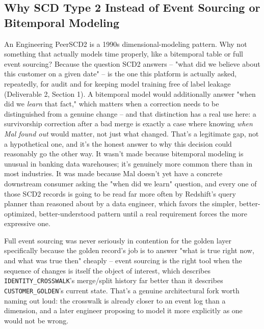 \documentclass[11pt]{article}
\begin{document}
\subsection{Why SCD Type 2 Instead of Event Sourcing or Bitemporal Modeling}
\begin{stakeholderq}{An Engineering Peer}{SCD2 is a 1990s dimensional-modeling pattern. Why not something that actually models time properly, like a bitemporal table or full event sourcing?}
Because the question SCD2 answers -- "what did we believe about this customer on a given date" -- is the one this platform is actually asked, repeatedly, for audit and for keeping model training free of label leakage (Deliverable 2, Section 1). A bitemporal model would additionally answer "when did we \emph{learn} that fact," which matters when a correction needs to be distinguished from a genuine change -- and that distinction has a real use here: a survivorship correction after a bad merge is exactly a case where knowing \emph{when Mal found out} would matter, not just what changed. That's a legitimate gap, not a hypothetical one, and it's the honest answer to why this decision could reasonably go the other way. It wasn't made because bitemporal modeling is unusual in banking data warehouses; it's genuinely more common there than in most industries. It was made because Mal doesn't yet have a concrete downstream consumer asking the "when did we learn" question, and every one of those SCD2 records is going to be read far more often by Redshift's query planner than reasoned about by a data engineer, which favors the simpler, better-optimized, better-understood pattern until a real requirement forces the more expressive one.

Full event sourcing was never seriously in contention for the golden layer specifically because the golden record's job is to answer "what is true right now, and what was true then" cheaply -- event sourcing is the right tool when the sequence of changes is itself the object of interest, which describes \texttt{IDENTITY\_CROSSWALK}'s merge/split history far better than it describes \texttt{CUSTOMER\_GOLDEN}'s current state. That's a genuine architectural fork worth naming out loud: the crosswalk is already closer to an event log than a dimension, and a later engineer proposing to model it more explicitly as one would not be wrong.
\end{stakeholderq}
\end{document}
